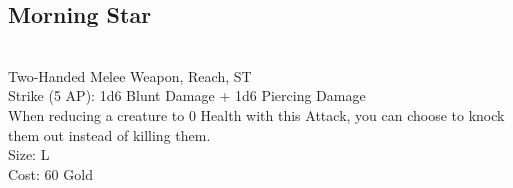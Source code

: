 \subsection{Morning Star}\label{weapon:morningStar}\\
Two-Handed Melee Weapon,  Reach, ST\\
Strike (5 AP): 1d6 Blunt Damage + 1d6 Piercing Damage\\
When reducing a creature to 0 Health with this Attack, you can choose to knock them out instead of killing them.\\
Size: L\\
Cost: 60 Gold\\